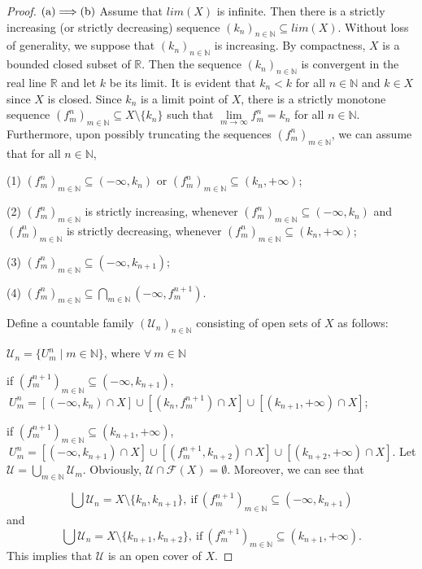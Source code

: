 \documentclass[preprint,12pt]{elsarticle}
\numberwithin{equation}{section}
\begin{document}
\begin{proof}${\rm (a)\Longrightarrow(b)}$ Assume that $lim(X)$ is infinite. Then there is a strictly increasing (or strictly decreasing) sequence $(k_{n})_{n\in\mathbb{N}}\subseteq lim(X)$. Without loss of generality, we suppose that $(k_{n})_{n\in\mathbb{N}}$ is increasing. By compactness, $X$ is a bounded closed subset of $\mathbb{R}$. Then the sequence $(k_{n})_{n\in\mathbb{N}}$ is  convergent in the real line $\mathbb{R}$ and let $k$ be its limit. It is evident that $k_{n}< k$ for all $n\in\mathbb{N}$ and $k\in X$ since $X$ is closed. Since $k_{n}$ is a limit point of $X$, there is a strictly monotone sequence $(f^{n}_{m})_{m\in\mathbb{N}}\subseteq X\setminus\{k_{n}\}$ such that $\lim\limits_{m\longrightarrow\infty}f^{n}_{m}=k_{n}$ for all $n\in\mathbb{N}$. Furthermore, upon possibly truncating the sequences $(f^{n}_{m})_{m\in\mathbb{N}}$, we can assume that for all $n\in\mathbb{N}$,

(1) $(f^{n}_{m})_{m\in\mathbb{N}}\subseteq(-\infty,k_{n})$ or $(f^{n}_{m})_{m\in\mathbb{N}}\subseteq(k_{n},+\infty)$;

(2) $(f^{n}_{m})_{m\in\mathbb{N}}$ is strictly increasing, whenever $(f^{n}_{m})_{m\in\mathbb{N}}\subseteq(-\infty,k_{n})$ and $(f^{n}_{m})_{m\in\mathbb{N}}$ is strictly decreasing, whenever $(f^{n}_{m})_{m\in\mathbb{N}}\subseteq(k_{n},+\infty)$;

(3) $(f^{n}_{m})_{m\in\mathbb{N}}\subseteq(-\infty,k_{n+1})$;

(4) $(f^{n}_{m})_{m\in\mathbb{N}}\subseteq\bigcap\limits_{m\in\mathbb{N}}(-\infty,f^{n+1}_{m})$.

Define a countable family $(\mathcal{U}_{n})_{n\in\mathbb{N}}$ consisting of open sets of $X$ as follows:

$\mathcal{U}_{n}=\{U^{n}_{m}\mid m\in\mathbb{N}\}$, where $\forall \ m\in\mathbb{N}$

 if $ (f^{n+1}_{m})_{m\in\mathbb{N}}\subseteq(-\infty,k_{n+1})$, $\ U^{n}_{m}= [(-\infty,k_{n})\cap X]\cup[(k_{n},f^{n+1}_{m})\cap X]\cup[(k_{n+1},+\infty)\cap X]$;

 if $(f^{n+1}_{m})_{m\in\mathbb{N}}\subseteq(k_{n+1},+\infty)$, $\ U^{n}_{m}=[(-\infty,k_{n+1})\cap X]\cup[(f^{n+1}_{m},k_{n+2})\cap X]\cup[(k_{n+2},+\infty)\cap X]$. Let $\mathcal{U}=\bigcup\limits_{m\in\mathbb{N}}\mathcal{U}_{m}$. Obviously, $\mathcal{U}\cap\mathscr{F}(X)=\emptyset$. Moreover, we can see that

 $$\bigcup\mathcal{U}_{n}=X\setminus\{k_{n},k_{n+1}\},\ \mbox{if}\ (f^{n+1}_{m})_{m\in\mathbb{N}}\subseteq(-\infty,k_{n+1})$$ and
 $$\bigcup\mathcal{U}_{n}=X\setminus\{k_{n+1},k_{n+2}\},\ \mbox{if}\ (f^{n+1}_{m})_{m\in\mathbb{N}}\subseteq(k_{n+1},+\infty).$$ This implies that $\mathcal{U}$ is an open cover of $X$.


\end{proof}
\end{document}
